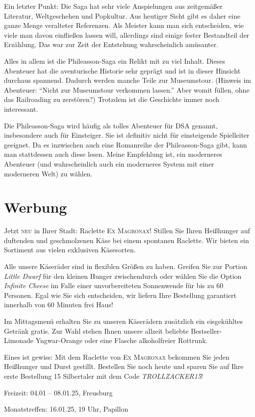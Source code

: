 \documentclass[final]{multiversum}
\begin{document}
Ein letzter Punkt: Die Saga hat sehr viele Anspielungen aus zeitgemäßer
Literatur, Weltgeschehen und Popkultur. Aus heutiger Sicht gibt es daher eine
ganze Menge veralteter Referenzen. Als Meister kann man sich entscheiden, wie
viele man davon einfließen lassen will, allerdings sind einige fester
Bestandteil der Erzählung. Das war zur Zeit der Entstehung wahrscheinlich
amüsanter.

Alles in allem ist die Phileasson-Saga ein Relikt mit zu viel Inhalt. Dieses
Abenteuer hat die aventurische Historie sehr geprägt und ist in dieser Hinsicht
durchaus spannend. Dadurch werden manche Teile zur Museumstour. (Hinweis im
Abenteuer: \enquote{Nicht zur Museumstour verkommen lassen.} Aber womit füllen,
ohne das Railroading zu zerstören?) Trotzdem ist die Geschichte immer noch
interessant.

Die Phileasson-Saga wird häufig als tolles Abenteuer für DSA genannt,
insbesondere auch für Einsteiger. Sie ist definitiv nicht für einsteigende
Spielleiter geeignet. Da es inzwischen auch eine Romanreihe der
Phileasson-Saga gibt, kann man stattdessen auch diese lesen. Meine Empfehlung
ist, ein moderneres Abenteuer (und wahrscheinlich auch ein moderneres System mit
einer moderneren Welt) zu wählen.

\section{Werbung}
Jetzt \textsc{neu} in Ihrer Stadt: Raclette \textsc{Ex Magronax}! Stillen Sie Ihren
Heißhunger auf duftenden und geschmolzenen Käse bei einem spontanen Raclette.
Wir bieten ein Sortiment aus vielen exklusiven Käsesorten.

Alle unsere Käseräder sind in flexiblen Größen zu haben. Greifen Sie zur Portion
\emph{Little Dwarf} für den kleinen Hunger zwischendurch oder wählen Sie die Option
\emph{Infinite Cheese} im Falle einer unvorbereiteten Sonnenwende für bis zu 60
Personen. Egal wie Sie sich entscheiden, wir liefern Ihre Bestellung garantiert
innerhalb von 60 Minuten frei Haus!

Im Mittagsmenü erhalten Sie zu unseren Käserädern zusätzlich ein eisgekühltes Getränk
gratis. Zur Wahl stehen Ihnen unsere allzeit beliebte Bestseller-Limonade
Yngwar-Orange oder eine Flasche alkoholfreier Rottrunk.

Eines ist gewiss: Mit dem Raclette von \textsc{Ex Magronax} bekommen Sie jeden
Heißhunger und Durst gestillt. Bestellen Sie noch heute und sparen Sie auf Ihre
erste Bestellung 15 Silbertaler mit dem Code \emph{TROLLZACKER15}!
\begin{termine}
  \item Freizeit: 04.01 -- 08.01.25, Freusburg
  \item Monatstreffen: 16.01.25, 19 Uhr, Papillon
\end{termine}
\impressum
\end{document}
